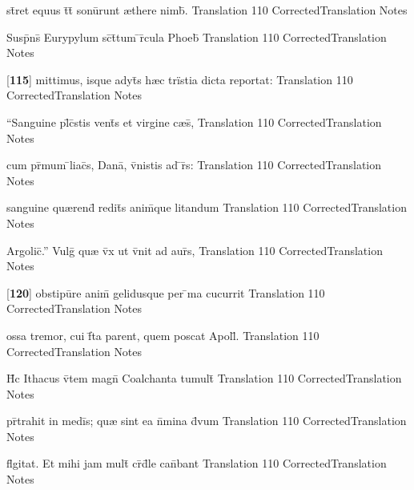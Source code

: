 \latline
  {st\={}ret equus t\={}t\={} sonu\={}runt {\ae}there nimb\={\macron {\i}}.}
  { Translation }
  {110}
  { CorrectedTranslation }
  { Notes }


\latline
  {Susp\={}ns\={\macron {\i}} Eurypylum sc\={\macron {\i}}t\={}tum \={}r\={}cula Phoeb\={\macron {\i}}}
  { Translation }
  {110}
  { CorrectedTranslation }
  { Notes }


\latline
  {[\textbf{115}] mittimus, isque adyt\={\macron {\i}}s h{\ae}c tr\"{i}stia dicta reportat:}
  { Translation }
  {110}
  { CorrectedTranslation }
  { Notes }


\latline
  {``Sanguine pl\={}c\={}stis vent\={}s et virgine c{\ae}s\={},}
  { Translation }
  {110}
  { CorrectedTranslation }
  { Notes }


\latline
  {cum pr\={\macron {\i}}mum \={}liac\={}s, Dana\={\macron {\i}}, v\={}nistis ad \={}r\={}s:}
  { Translation }
  {110}
  { CorrectedTranslation }
  { Notes }


\latline
  {sanguine qu{\ae}rend\={\macron {\i}} redit\={}s anim\={}que litandum}
  { Translation }
  {110}
  { CorrectedTranslation }
  { Notes }


\latline
  {Argolic\={}.''  Vulg\={\macron {\i}} qu{\ae} v\={}x ut v\={}nit ad aur\={\macron {\i}}s,}
  { Translation }
  {110}
  { CorrectedTranslation }
  { Notes }


\latline
  {[\textbf{120}] obstipu\={}re anim\={\macron {\i}} gelidusque per \={\macron {\i}}ma cucurrit}
  { Translation }
  {110}
  { CorrectedTranslation }
  { Notes }


\latline
  {ossa tremor, cui f\={}ta parent, quem poscat Apoll\={}.}
  { Translation }
  {110}
  { CorrectedTranslation }
  { Notes }


\latline
  {H\={\macron {\i}}c Ithacus v\={}tem magn\={} Coalchanta tumult\={}}
  { Translation }
  {110}
  { CorrectedTranslation }
  { Notes }


\latline
  {pr\={}trahit in medi\={}s; qu{\ae} sint ea n\={}mina d\={\macron {\i}}vum}
  { Translation }
  {110}
  { CorrectedTranslation }
  { Notes }


\latline
  {fl\={}gitat.  Et mihi jam mult\={\macron {\i}} cr\={}d\={}le can\={}bant}
  { Translation }
  {110}
  { CorrectedTranslation }
  { Notes }


